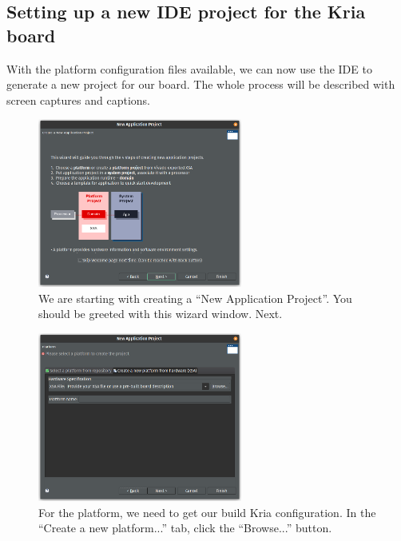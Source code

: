 \documentclass[10pt]{article}
\begin{document}
\pagebreak
\subsection{Setting up a new IDE project for the Kria board}
With the platform configuration files available, we can now use the IDE to generate a
new project for our board. The whole process will be described with screen captures and
captions.

\begin{figure}[H]
  \centering
  \includegraphics[width=0.6\textwidth]{./img/vitis_new/project1}
  \caption{We are starting with creating a ``New Application Project''. You should be greeted with this wizard window. Next.}
\end{figure}

\begin{figure}[H]
  \centering
  \includegraphics[width=0.6\textwidth]{./img/vitis_new/project2}
  \caption{For the platform, we need to get our build Kria configuration. In the ``Create a new platform...'' tab, click the ``Browse...'' button.}
\end{figure}
\end{document}
